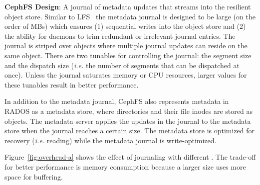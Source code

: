 \textbf{CephFS Design}: A journal of metadata updates that streams into the
resilient object store. Similar to LFS~\cite{rosenblum:acm1992-LFS} 
the metadata journal is designed to be large (on
the order of MBs) which ensures (1) sequential writes into the object store and
(2) the ability for daemons to trim redundant or irrelevant journal entries.
The journal is striped over objects where multiple journal updates can reside
on the same object. There are two tunables for controlling the journal: the segment size
and the dispatch size ({\it i.e.} the number of segments that can be dispatched
at once).  Unless the journal saturates memory or CPU resources, larger values
for these tunables result in better performance.

In addition to the metadata journal, CephFS also represents metadata in RADOS
as a metadata store, where directories and their file inodes are stored as
objects.  The metadata server applies the updates in the journal to the
metadata store when the journal reaches a certain size. The metadata store is
optimized for recovery ({\it i.e.} reading) while the metadata journal is
write-optimized.


Figure~\ref{fig:overhead-a} shows the effect of journaling with different
.  The trade-off for better performance
is memory consumption because a larger
 size uses more space for buffering.

